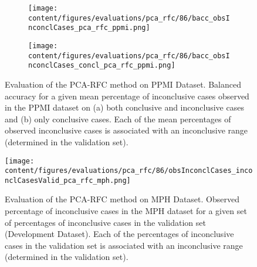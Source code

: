 \begin{figure}[t]
\begin{subfigure}{0.9\textwidth}
  \centering
  \texttt{[image: content/figures/evaluations/pca\_rfc/86/bacc\_obsInconclCases\_pca\_rfc\_ppmi.png]}
  \subcaption{}
  \label{fig:bacc_obsInconclCases_pca_rfc_ppmi}
\end{subfigure}
\hfill
\begin{subfigure}{0.9\textwidth}
  \centering
  \texttt{[image: content/figures/evaluations/pca\_rfc/86/bacc\_obsInconclCases\_concl\_pca\_rfc\_ppmi.png]}
  \subcaption{}
  \label{fig:bacc_obsInconclCases_concl_pca_rfc_ppmi}
\end{subfigure}

\caption{Evaluation of the PCA-RFC method on PPMI Dataset.
Balanced accuracy for a given mean percentage of inconclusive cases observed in the PPMI dataset on 
(a) both conclusive and inconclusive cases and (b) only conclusive cases. 
Each of the mean percentages of observed inconclusive cases is associated 
with an inconclusive range (determined in the validation set). }
\label{fig:bacc_obsInconclCases_pca_rfc_ppmi_full}
\end{figure}





\begin{figure}[h]
\centering
\texttt{[image: content/figures/evaluations/pca\_rfc/86/obsInconclCases\_inconclCasesValid\_pca\_rfc\_mph.png]}
\caption{Evaluation of the PCA-RFC method on MPH Dataset.
Observed percentage of inconclusive cases in the MPH dataset 
for a given set of percentages of inconclusive cases in the validation set (Development Dataset).
Each of the percentages of inconclusive cases in the validation set is associated 
with an inconclusive range (determined in the validation set).} 
\label{fig:obsInconclCases_inconclCasesValid_pca_rfc_mph}
\end{figure} 


